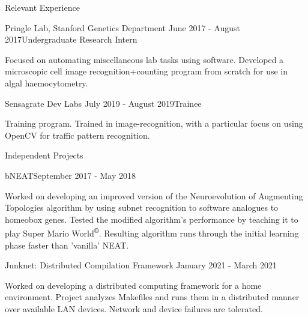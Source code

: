 \documentclass{resume} %
\begin{document}
\begin{resumeSection}{Relevant Experience}

\begin{resumeSubsection}{Pringle Lab, Stanford Genetics Department}
	{June 2017 - August 2017}{Undergraduate Research Intern}{}
\item Focused on automating miscellaneous lab tasks using software. Developed a
	microscopic cell image recognition+counting program from scratch for
	use in algal haemocytometry.
\end{resumeSubsection}
\begin{resumeSubsection}{Sensagrate Dev Labs}
	{July 2019 - August 2019}{Trainee}{}
\item Training program. Trained in image-recognition, with a particular focus
	on using OpenCV for traffic pattern recognition.
\end{resumeSubsection}

\end{resumeSection}


\begin{resumeSection}{Independent Projects} \itemsep -2pt

\begin{resumeSubsection}{bNEAT}{September 2017 - May 2018}{}{}
\item Worked on developing an improved version of the Neuroevolution of
	Augmenting Topologies algorithm by using subnet recognition to
	software analogues to homeobox genes. Tested the modified
	algorithm's performance by teaching it to play Super Mario
	World\textsuperscript{®}. Resulting algorithm runs through the initial
	learning phase faster than 'vanilla' NEAT.
\end{resumeSubsection}
\begin{resumeSubsection}{Junknet: Distributed Compilation Framework}
	{January 2021 - March 2021}{}{}
\item Worked on developing a distributed computing framework for a home
	environment. Project analyzes Makefiles and runs them in a distributed
	manner over available LAN devices. Network and device failures are
	tolerated.
\end{resumeSubsection}

\end{resumeSection}
\end{document}
